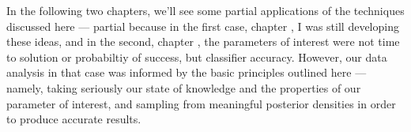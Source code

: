 In the following two chapters, we'll see some partial applications of the techniques discussed here --- partial because in the first case, chapter \cite{ch:planted}, I was still developing these ideas, and in the second, chapter \cite{ch:higgs}, the parameters of interest were not time to solution or probabiltiy of success, but classifier accuracy. However, our data analysis in that case was informed by the basic principles outlined here --- namely, taking seriously our state of knowledge and the properties of our parameter of interest, and sampling from meaningful posterior densities in order to produce accurate results.

% 
%
% 
% 
